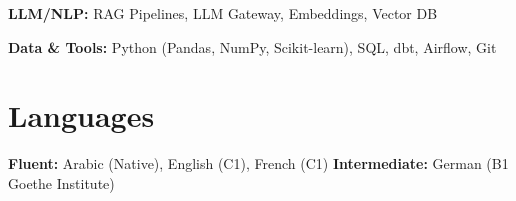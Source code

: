 \documentclass[10pt, a4paper]{article}
\newenvironment{onecolentry}{\par}{\par}
\begin{document}
\begin{onecolentry}
    \textbf{LLM/NLP:} RAG Pipelines, LLM Gateway, Embeddings, Vector DB
\end{onecolentry}

\vspace{0.1 cm}

\begin{onecolentry}
    \textbf{Data \& Tools:} Python (Pandas, NumPy, Scikit-learn), SQL, dbt, Airflow, Git
\end{onecolentry}

\section{Languages}

\begin{onecolentry}
    \textbf{Fluent:} Arabic (Native), English (C1), French (C1) \quad \textbf{Intermediate:} German (B1 Goethe Institute)
\end{onecolentry}
\end{document}
